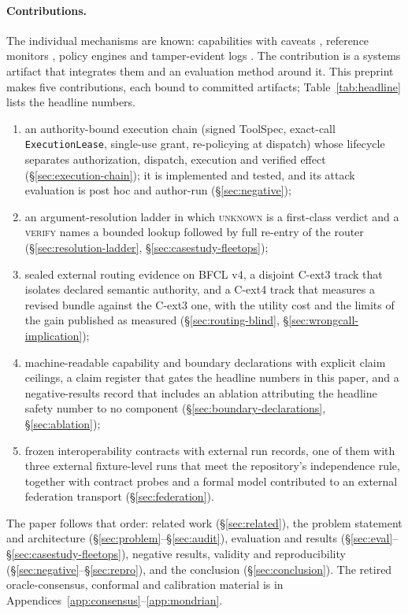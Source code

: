 \documentclass[10pt,twocolumn]{article}
\begin{document}
\paragraph{Contributions.} The individual mechanisms are known:
capabilities with caveats \cite{birgisson2014macaroons}, reference
monitors \cite{anderson1972planning}, policy engines and tamper-evident
logs \cite{crosby2009tamper}. The contribution is a systems artifact that integrates
them and an evaluation method around it. This preprint makes five
contributions, each
bound to committed artifacts; Table~\ref{tab:headline} lists the headline
numbers.
\begin{enumerate}[leftmargin=*,itemsep=1pt]
\item an authority-bound execution chain (signed ToolSpec, exact-call
  \texttt{ExecutionLease}, single-use grant, re-policying at dispatch) whose
  lifecycle separates authorization, dispatch, execution and verified effect
  (\S\ref{sec:execution-chain}); it is implemented and tested, and its
  attack evaluation is post hoc and author-run (\S\ref{sec:negative});
\item an argument-resolution ladder in which \textsc{unknown} is a
  first-class verdict and a \textsc{verify} names a bounded lookup followed
  by full re-entry of the router (\S\ref{sec:resolution-ladder},
  \S\ref{sec:casestudy-fleetops});
\item sealed external routing evidence on BFCL v4, a disjoint C-ext3
  track that isolates declared semantic authority, and a C-ext4 track that
  measures a revised bundle against the C-ext3 one, with the utility cost
  and the limits of the gain published as measured (\S\ref{sec:routing-blind},
  \S\ref{sec:wrongcall-implication});
\item machine-readable capability and boundary declarations with explicit
  claim ceilings, a claim register that gates the headline numbers in this paper,
  and a negative-results record that includes an ablation attributing the
  headline safety number to no component
  (\S\ref{sec:boundary-declarations}, \S\ref{sec:ablation});
\item frozen interoperability contracts with external run records, one of
  them with three external fixture-level runs that meet the repository's
  independence rule, together with contract probes and a
  formal model contributed to an external federation transport
  (\S\ref{sec:federation}).
\end{enumerate}
The paper follows that order: related work (\S\ref{sec:related}), the
problem statement and architecture
(\S\ref{sec:problem}--\S\ref{sec:audit}), evaluation and results
(\S\ref{sec:eval}--\S\ref{sec:casestudy-fleetops}), negative results,
validity and reproducibility (\S\ref{sec:negative}--\S\ref{sec:repro}), and
the conclusion (\S\ref{sec:conclusion}). The retired oracle-consensus,
conformal and calibration material is in
Appendices~\ref{app:consensus}--\ref{app:mondrian}.
\end{document}
